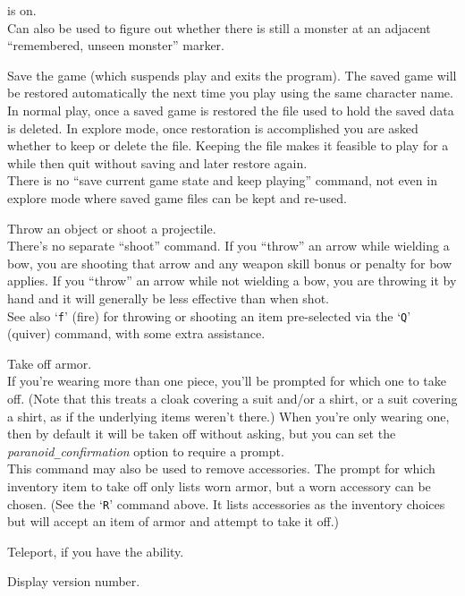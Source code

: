 is on.\\
Can also be used to figure out whether there is still a monster at
an adjacent ``remembered, unseen monster'' marker.
\item[\tb{S}]
Save the game (which suspends play and exits the program).
The saved game will be restored automatically the next time you play
using the same character name.\\
In normal play, once a saved game is restored the file used to hold
the saved data is deleted.
In explore mode, once restoration is accomplished you are asked whether
to keep or delete the file.
Keeping the file makes it feasible to play for a while then quit
without saving and later restore again.\\
There is no ``save current game state and keep playing'' command, not
even in explore mode where saved game files can be kept and re-used.
\item[\tb{t}]
Throw an object or shoot a projectile.\\
There's no separate ``shoot'' command.
If you ``throw'' an arrow while wielding a bow, you are shooting
that arrow and any weapon skill bonus or penalty for bow applies.
If you ``throw'' an arrow while not wielding a bow, you are throwing
it by hand and it will generally be less effective than when shot.\\
See also `{\tt f}' (fire) for throwing or shooting an item pre-selected
via the `{\tt Q}' (quiver) command, with some extra assistance.
\item[\tb{T}]
Take off armor.\\
If you're wearing more than one piece, you'll be prompted for which
one to take off.  (Note that this treats a cloak covering a suit
and/or a shirt, or a suit covering a shirt, as if the underlying items
weren't there.)
When you're only wearing one, then by default it will
be taken off without asking, but you can set the
{\it paranoid\verb+_+confirmation\/}
option to require a prompt.\\
This command may also be used to remove accessories.  The prompt
for which inventory item to take off only lists worn armor, but a worn
accessory can be chosen.
(See the `{\tt R}' command above.  It lists accessories as the inventory
choices but will accept an item of armor and attempt to take it off.)
\item[\tb{\^{}T}]
Teleport, if you have the ability.
\item[\tb{v}]
Display version number.

